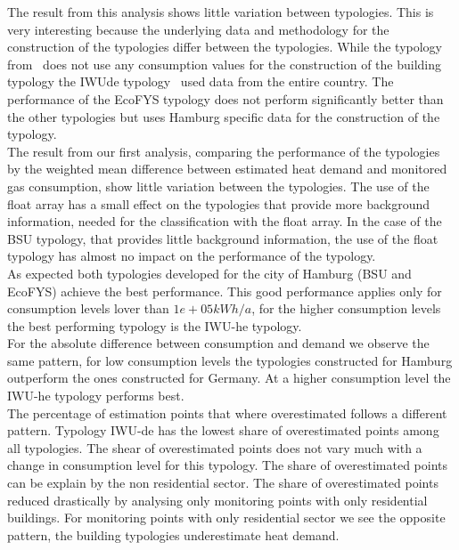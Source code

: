 \documentclass[authoryear,preprint,review,12pt]{elsarticle}
\begin{document}
\begin{linenumbers}
The result from this analysis shows little variation between typologies. This
is very interesting because the underlying data and methodology for the
construction of the typologies differ between the typologies. While the
typology from~\cite{Blesl.2002} does not use any consumption values for the
construction of the building typology the IWUde typology~\cite{IWU.2003} used
data from the entire country. The performance of the EcoFYS typology does not
perform significantly better than the other typologies but uses Hamburg
specific data for the construction of the typology.\\

The result from our first analysis, comparing the performance of the typologies
by the weighted mean difference between estimated heat demand and monitored gas
consumption, show little variation between the typologies. The use of the float
array has a small effect on the typologies that provide more background
information, needed for the classification with the float array. In the case of
the BSU typology, that provides little background information, the use of the
float typology has almost no impact on the performance of the typology.\\

As expected both typologies developed for the city of Hamburg (BSU and EcoFYS)
achieve the best performance. This good performance applies only for
consumption levels lover than $1e+05 kWh/a$, for the higher consumption levels
the best performing typology is the IWU-he typology.\\ 

For the absolute difference between consumption and demand we observe the same
pattern, for low consumption levels the typologies constructed for Hamburg
outperform the ones constructed for Germany. At a higher consumption level the
IWU-he typology performs best.\\

The percentage of estimation points that where overestimated follows a
different pattern. Typology IWU-de has the lowest share of overestimated points
among all typologies. The shear of overestimated points does not vary much with
a change in consumption level for this typology.
The share of overestimated points can be explain by the non residential sector.
The share of overestimated points reduced drastically by analysing only
monitoring points with only residential buildings. For monitoring points with
only residential sector we see the opposite pattern, the building typologies
underestimate heat demand.\\


\end{linenumbers}
\end{document}
